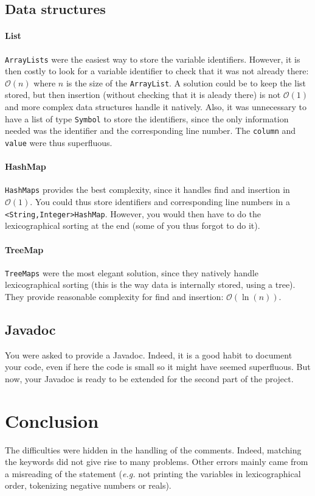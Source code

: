 \documentclass[a4paper]{article}
\newcommand{\bigO}{\mathcal{O}}
\begin{document}
\subsection{Data structures}

\paragraph{List} \texttt{ArrayLists} were the easiest way to store the variable identifiers. However, it is then costly to look for a variable identifier to check that it was not already there: $\bigO(n)$ where $n$ is the size of the \texttt{ArrayList}. A solution could be to keep the list stored, but then insertion (without checking that it is aleady there) is not $\bigO(1)$ and more complex data structures handle it natively. Also, it was unnecessary to have a list of type \texttt{Symbol} to store the identifiers, since the only information needed was the identifier and the corresponding line number. The \texttt{column} and \texttt{value} were thus superfluous.
\paragraph{HashMap} \texttt{HashMaps} provides the best complexity, since it handles find and insertion in $\bigO(1)$. You could thus store identifiers and corresponding line numbers in a \texttt{<String,Integer>HashMap}. However, you would then have to do the lexicographical sorting at the end (some of you thus forgot to do it).
\paragraph{TreeMap} \texttt{TreeMaps} were the most elegant solution, since they natively handle lexicographical sorting (this is the way data is internally stored, using a tree). They provide reasonable complexity for find and insertion: $\bigO(\ln(n))$.

\subsection{Javadoc}

You were asked to provide a Javadoc. Indeed, it is a good habit to document your code, even if here the code is small so it might have seemed superfluous. But now, your Javadoc is ready to be extended for the second part of the project.

\section{Conclusion}

The difficulties were hidden in the handling of the comments. Indeed, matching the keywords did not give rise to many problems. Other errors mainly came from a misreading of the statement (\emph{e.g.} not printing the variables in lexicographical order, tokenizing negative numbers or reals).
\end{document}
